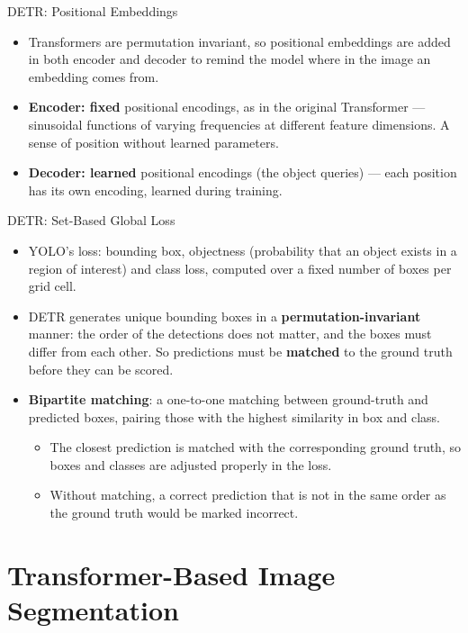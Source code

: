 \begin{frame}{DETR: Positional Embeddings}
\begin{itemize}
  \item Transformers are permutation invariant, so positional embeddings are added in both encoder and decoder to remind the model where in the image an embedding comes from.
  \item \textbf{Encoder: fixed} positional encodings, as in the original Transformer --- sinusoidal functions of varying frequencies at different feature dimensions. A sense of position without learned parameters.
  \item \textbf{Decoder: learned} positional encodings (the object queries) --- each position has its own encoding, learned during training.
\end{itemize}
\end{frame}

\begin{frame}{DETR: Set-Based Global Loss}
\footnotesize%

\begin{itemize}
  \item YOLO's loss: bounding box, objectness (probability that an object exists in a region of interest) and class loss, computed over a fixed number of boxes per grid cell.
  \item DETR generates unique bounding boxes in a \textbf{permutation-invariant} manner: the order of the detections does not matter, and the boxes must differ from each other. So predictions must be \textbf{matched} to the ground truth before they can be scored.
  \item \textbf{Bipartite matching}: a one-to-one matching between ground-truth and predicted boxes, pairing those with the highest similarity in box and class.
  \begin{itemize}
    \item The closest prediction is matched with the corresponding ground truth, so boxes and classes are adjusted properly in the loss.
    \item Without matching, a correct prediction that is not in the same order as the ground truth would be marked incorrect.
  \end{itemize}
\end{itemize}
\end{frame}

\section{Transformer-Based Image Segmentation}

